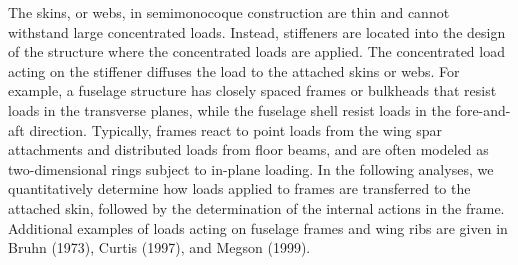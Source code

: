 \documentclass{AeroStructure-ERJohnson}
\begin{document}
The skins, or webs, in semimonocoque construction are thin and cannot withstand large concentrated loads. Instead, stiffeners are located into the design of the structure where the concentrated loads are applied. The concentrated load acting on the stiffener diffuses the load to the attached skins or webs. For example, a fuselage structure has closely spaced frames or bulkheads that resist loads in the transverse planes, while the fuselage shell resist loads in the fore-and-aft direction. Typically, frames react to point loads from the wing spar attachments and distributed loads from floor beams, and are often modeled as two-dimensional rings subject to in-plane loading. In the following analyses, we quantitatively determine how loads applied to frames are transferred to the\vadjust{\vspace*{10pt}\pagebreak} attached skin, followed by the determination of the internal actions in the frame. Additional examples of loads acting on fuselage frames and wing ribs are given in Bruhn (1973), Curtis (1997), and Megson (1999).

{\def\thefigure{7.17}
}
\end{document}

